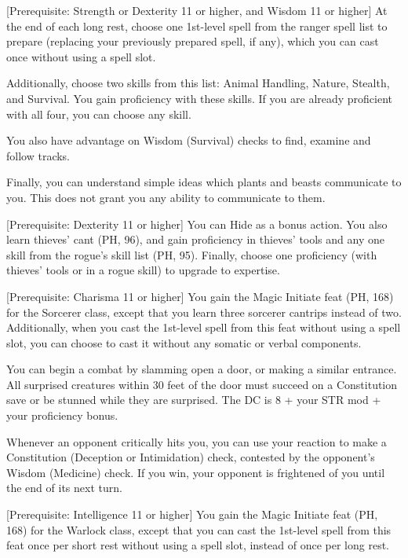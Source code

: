 \documentclass[letterpaper,twocolumn,openany,nodeprecatedcode,bg=print]{dndbook}
\begin{document}
[Prerequisite: Strength or Dexterity 11 or higher, and Wisdom 11 or higher]
\label{ranger-initiate}
At the end of each long rest, choose one 1st-level spell from the ranger spell list to prepare (replacing your previously prepared spell, if any), which you can cast once without using a spell slot. 

Additionally, choose two skills from this list: Animal Handling, Nature, Stealth, and Survival. 
You gain proficiency with these skills. 
If you are already proficient with all four, you can choose any skill.

You also have advantage on Wisdom (Survival) checks to find, examine and follow tracks.

Finally, you can understand simple ideas which plants and beasts communicate to you. 
This does not grant you any ability to communicate to them.

[Prerequisite: Dexterity 11 or higher]
\label{rogue-initiate}
You can Hide as a bonus action. 
You also learn thieves' cant (PH, 96), and gain proficiency in thieves' tools and any one skill from the rogue's skill list (PH, 95). 
Finally, choose one proficiency (with thieves' tools or in a rogue skill) to upgrade to expertise.

[Prerequisite: Charisma 11 or higher]
\label{sorcerer-initiate}
You gain the Magic Initiate feat (PH, 168) for the Sorcerer class, except that you learn three sorcerer cantrips instead of two. 
Additionally, when you cast the 1st-level spell from this feat without using a spell slot, you can choose to cast it without any somatic or verbal components.

\label{stunning-irruption}
You can begin a combat by slamming open a door, or making a similar entrance. 
All surprised creatures within 30 feet of the door must succeed on a Constitution save or be stunned while they are surprised. 
The DC is 8 + your STR mod + your proficiency bonus.

\label{tis-but-a-scratch}
Whenever an opponent critically hits you, you can use your reaction to make a Constitution (Deception or Intimidation) check, contested by the opponent's Wisdom (Medicine) check. 
If you win, your opponent is frightened of you until the end of its next turn.

[Prerequisite: Intelligence 11 or higher]
\label{warlock-initiate}
You gain the Magic Initiate feat (PH, 168) for the Warlock class, 
except that you can cast the 1st-level spell from this feat once per short rest without using a spell slot, instead of once per long rest.
\end{document}
